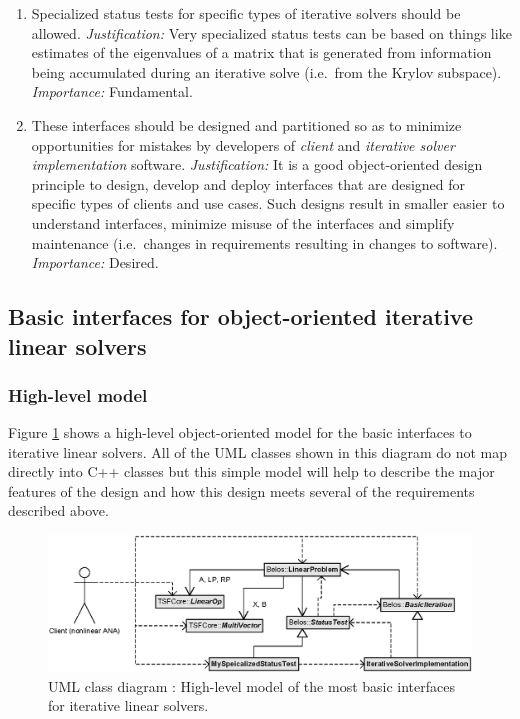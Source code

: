 \documentclass[pdf,ps2pdf,11pt]{SANDreport}
\begin{document}
\begin{enumerate}
\item
Specialized status tests for specific types of iterative solvers
should be allowed.  {}\textit{Justification:} Very specialized status
tests can be based on things like estimates of the eigenvalues of a
matrix that is generated from information being accumulated during an
iterative solve (i.e.~from the Krylov subspace).  {}\textit{Importance:} Fundamental.

\item
These interfaces should be designed and partitioned so as to minimize
opportunities for mistakes by developers of {}\textit{client} and
{}\textit{iterative solver implementation} software.
{}\textit{Justification:} It is a good object-oriented design
principle to design, develop and deploy interfaces that are designed
for specific types of clients and use cases.  Such designs result in
smaller easier to understand interfaces, minimize misuse of the
interfaces and simplify maintenance (i.e.~changes in requirements
resulting in changes to software).  {}\textit{Importance:} Desired.

\end{enumerate}

\subsection{Basic interfaces for object-oriented iterative linear solvers}

\subsubsection{High-level model}

Figure {}\ref{belos:fig:BelosInterfacesSimple} shows a high-level
object-oriented model for the basic interfaces to iterative linear
solvers.  All of the UML classes shown in this diagram do not map
directly into C++ classes but this simple model will help to describe
the major features of the design and how this design meets several of
the requirements described above.

{\bsinglespace
\begin{figure}[t]
\begin{center}
\includegraphics*[scale=0.85]{BelosInterfacesSimple}
\end{center}
\caption{
\label{belos:fig:BelosInterfacesSimple}
UML class diagram : High-level model of
the most basic interfaces for iterative linear solvers.}
\end{figure}
\esinglespace}
\end{document}
